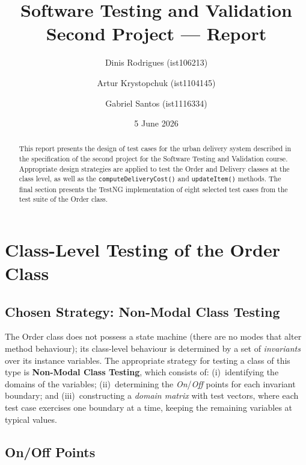 \documentclass[11pt, a4paper]{article}
\title{%
  Software Testing and Validation \\[0.3em]
  \large Second Project --- Report%
}
\author{%
  Dinis Rodrigues (ist106213)   \and
  Artur Krystopchuk (ist1104145) \and
  Gabriel Santos (ist1116334)%
}
\date{5 June 2026}
\newcommand{\classname}[1]{\textsf{#1}}
\newcommand{\methodname}[1]{\texttt{#1()}}
\begin{document}

\maketitle

\begin{abstract}
  This report presents the design of test cases for the urban delivery system described in the specification of the second project for the Software Testing and Validation course. Appropriate design strategies are applied to test the \classname{Order} and \classname{Delivery} classes at the class level, as well as the \methodname{computeDeliveryCost} and \methodname{updateItem} methods. The final section presents the TestNG implementation of eight selected test cases from the test suite of the \classname{Order} class.
\end{abstract}

\tableofcontents
\newpage

\section{Class-Level Testing of the \classname{Order} Class}
\label{sec:order-class}

\subsection{Chosen Strategy: Non-Modal Class Testing}
\label{sec:order-strategy}

The \classname{Order} class does not possess a state machine (there are no modes that alter method behaviour); its class-level behaviour is determined by a set of \emph{invariants} over its instance variables. The appropriate strategy for testing a class of this type is \textbf{Non-Modal Class Testing}, which consists of:
(i)~identifying the domains of the variables;
(ii)~determining the \emph{On}/\emph{Off} points for each invariant boundary; and
(iii)~constructing a \emph{domain matrix} with test vectors, where each test case exercises one boundary at a time, keeping the remaining variables at typical values.

\subsection{On/Off Points}
\label{sec:order-onoff}
\end{document}
